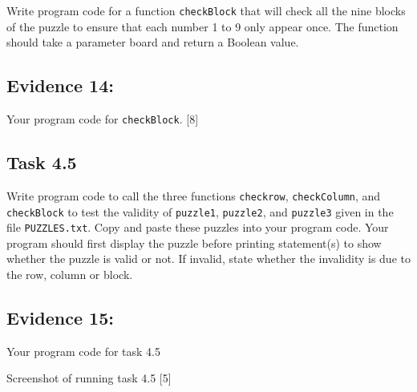 Write program code for a function \texttt{checkBlock} that will check
all the nine blocks of the puzzle to ensure that each number 1 to
9 only appear once. The function should take a parameter board and
return a Boolean value. 

\subsection*{Evidence 14: }

Your program code for \texttt{checkBlock}.\hfill{} {[}8{]}

\subsection*{Task 4.5 }

Write program code to call the three functions \texttt{checkrow},
\texttt{checkColumn}, and \texttt{checkBlock} to test the validity
of \texttt{puzzle1}, \texttt{puzzle2}, and \texttt{puzzle3} given
in the file \texttt{PUZZLES.txt}. Copy and paste these puzzles into
your program code. Your program should first display the puzzle before
printing statement(s) to show whether the puzzle is valid or not.
If invalid, state whether the invalidity is due to the row, column
or block.

\subsection*{Evidence 15:}

\textbullet{} Your program code for task 4.5 

\textbullet{} Screenshot of running task 4.5\hfill{} {[}5{]}